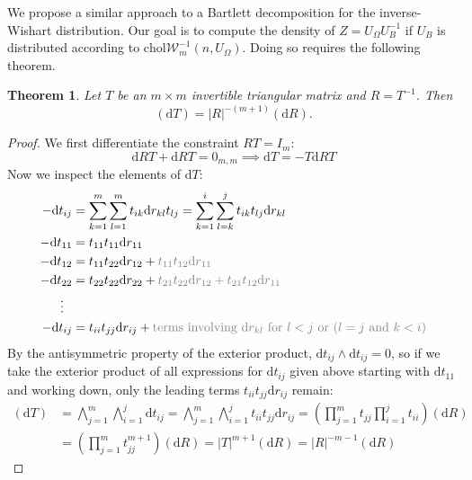 \documentclass[12pt,a4paper,reqno]{amsart}
\numberwithin{equation}{section}
\newtheorem{theorem}{Theorem}[section]
\newcommand{\cholinvwishart}[1]{\mathrm{chol}\mathcal{W}^{-1}_{#1}}
\renewcommand{\det}[1]{\left| {#1} \right|}
\newcommand{\dmeasure}[1]{\left(\dd{#1}\right)}
\newcommand{\dd}[1]{\mathrm{d}{#1}}
\newcommand{\zeromat}[2]{0_{#1,#2}}
\begin{document}
We propose a similar approach to a Bartlett decomposition for the inverse-Wishart distribution.
Our goal is to compute the density of $Z= U_\Omega U_B^{-1}$ if $U_B$ is distributed according to $\cholinvwishart{m}(n, U_\Omega)$.
Doing so requires the following theorem.

\begin{theorem}\label{triinvjac}
    Let $T$ be an $m \times m$ invertible triangular matrix and $R=T^{-1}$.
    Then
    \[
        \dmeasure{T} = \det{R}^{-(m+1)} \dmeasure{R}.
    \]
\end{theorem}
\begin{proof}
    We first differentiate the constraint $R T = I_m$:
    \[
        \dd{R} T + \dd{R} T = \zeromat{m}{m} \implies \dd{T} = -T \dd{R}T
    \]
    Now we inspect the elements of $\dd{T}$:
    \begin{align*}
        -\dd{t}_{ij} & = \sum_{k=1}^m \sum_{l=1}^m t_{ik} \dd{r}_{kl} t_{lj} = \sum_{k=1}^i \sum_{l=k}^j t_{ik} t_{lj} \dd{r}_{kl}                                  \\
        -\dd{t}_{11} & = t_{11} t_{11} \dd{r}_{11}                                                                                                                  \\
        -\dd{t}_{12} & = t_{11} t_{22} \dd{r}_{12} + \textcolor{gray}{t_{11} t_{12} \dd{r}_{11}}                                                                    \\
        -\dd{t}_{22} & = t_{22} t_{22} \dd{r}_{22} + \textcolor{gray}{t_{21} t_{22} \dd{r}_{12} + t_{21} t_{12} \dd{r}_{11}}                                        \\
        \vdots \ \   &                                                                                                                                              \\
        -\dd{t}_{ij} & = t_{ii} t_{jj}\dd{r}_{ij} + \textcolor{gray}{\text{terms involving } \dd{r}_{kl} \text{ for } l < j \text{ or } (l = j \text{ and } k < i)}
    \end{align*}
    By the antisymmetric property of the exterior product, $\dd{t}_{ij} \wedge \dd{t}_{ij} = 0$, so if we take the exterior product of all expressions for $\dd{t}_{ij}$ given above starting with $\dd{t}_{11}$ and working down, only the leading terms $t_{ii} t_{jj} \dd{r}_{ij}$ remain:
    \begin{align*}
        \dmeasure{T} & = \bigwedge_{j=1}^m \bigwedge_{i=1}^j \dd{t}_{ij} = \bigwedge_{j=1}^m \bigwedge_{i=1}^j t_{ii} t_{jj} \dd{r}_{ij} = \left(\prod_{j=1}^m t_{jj} \prod_{i=1}^j t_{ii} \right) \dmeasure{R} \\
                     & =\left(\prod_{j=1}^m t_{jj}^{m+1}\right) \dmeasure{R} = \det{T}^{m+1} \dmeasure{R} = \det{R}^{-m-1} \dmeasure{R}
    \end{align*}
\end{proof}
\end{document}

